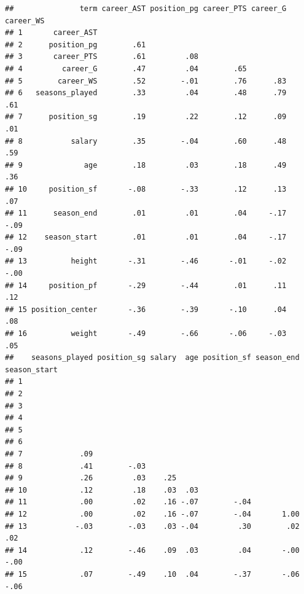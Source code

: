 \documentclass[
]{book}
\begin{document}
\begin{verbatim}
##               term career_AST position_pg career_PTS career_G career_WS
## 1       career_AST                                                     
## 2      position_pg        .61                                          
## 3       career_PTS        .61         .08                              
## 4         career_G        .47         .04        .65                   
## 5        career_WS        .52        -.01        .76      .83          
## 6   seasons_played        .33         .04        .48      .79       .61
## 7      position_sg        .19         .22        .12      .09       .01
## 8           salary        .35        -.04        .60      .48       .59
## 9              age        .18         .03        .18      .49       .36
## 10     position_sf       -.08        -.33        .12      .13       .07
## 11      season_end        .01         .01        .04     -.17      -.09
## 12    season_start        .01         .01        .04     -.17      -.09
## 13          height       -.31        -.46       -.01     -.02      -.00
## 14     position_pf       -.29        -.44        .01      .11       .12
## 15 position_center       -.36        -.39       -.10      .04       .08
## 16          weight       -.49        -.66       -.06     -.03       .05
##    seasons_played position_sg salary  age position_sf season_end season_start
## 1                                                                            
## 2                                                                            
## 3                                                                            
## 4                                                                            
## 5                                                                            
## 6                                                                            
## 7             .09                                                            
## 8             .41        -.03                                                
## 9             .26         .03    .25                                         
## 10            .12         .18    .03  .03                                    
## 11            .00         .02    .16 -.07        -.04                        
## 12            .00         .02    .16 -.07        -.04       1.00             
## 13           -.03        -.03    .03 -.04         .30        .02          .02
## 14            .12        -.46    .09  .03         .04       -.00         -.00
## 15            .07        -.49    .10  .04        -.37       -.06         -.06

\end{verbatim}
\end{document}
